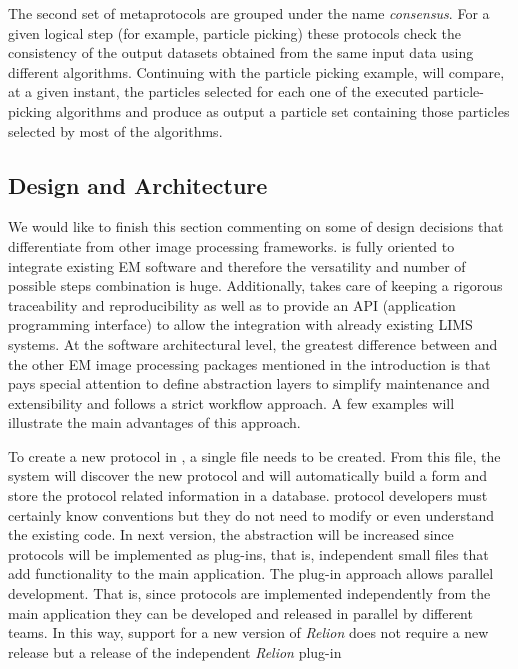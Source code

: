 The second set of metaprotocols are grouped under the name \emph{consensus}. For a given logical step (for example, particle picking) these protocols check 
the consistency of the output datasets obtained from the same input data using different algorithms. Continuing with the particle picking example,  will compare, at a given instant, the particles selected for each one of the executed particle-picking algorithms and produce as output a particle set containing those particles selected by most of the algorithms.


\subsection{\scipion Design and Architecture}

We would like to finish this section commenting on some of \scipion  design decisions that differentiate \scipion from other image processing frameworks. \scipion
is fully oriented to integrate existing
EM software and therefore the versatility and number of possible steps
combination is huge. Additionally, \scipion takes care of keeping a 
rigorous traceability and reproducibility as well as to provide an API (application programming interface) to allow the integration  with already existing LIMS systems. At the software architectural level,  the greatest difference 
between \scipion and the other EM image processing packages mentioned in the introduction 
is that  \scipion pays special attention to define abstraction layers to simplify maintenance
and extensibility and follows a strict workflow approach. A few examples will illustrate the main advantages of this approach.

To create a new protocol in \scipion, a single \python file needs to be created. From this file, the system will discover the new protocol and will automatically build
a form and store the protocol related information in a database.
\scipion protocol developers must certainly know \scipion conventions
but they do not need to modify or even understand the existing code.
In  \scipion next version, the abstraction will be increased
since protocols will be implemented as plug-ins,
that is, independent small \python files  that add functionality to the main
\scipion application. The plug-in approach allows parallel development. That is,  
since protocols are implemented independently from the main application
they can be developed and released in parallel by different teams. In this way, support for a new version of \textit{Relion} does not require a new \scipion release but
a release of the independent \textit{Relion} plug-in

